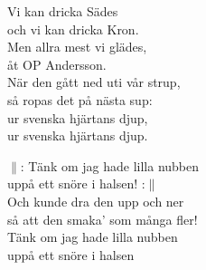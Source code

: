 \documentclass[a6paper, 10pt, twoside]{article}
\begin{document}
\noindent
\begin{center}
\end{center}
\begin{lyrics}
Vi kan dricka Sädes \\
och vi kan dricka Kron. \\
Men allra mest vi glädes, \\
åt OP Andersson.
\vspace{5pt}\\
När den gått ned uti vår strup, \\
så ropas det på nästa sup: \\
ur svenska hjärtans djup, \\
ur svenska hjärtans djup. 
\end{lyrics}
\vspace{30pt}
\begin{center}
\end{center}
\begin{lyrics}
$\|$: Tänk om jag hade lilla nubben \\
uppå ett snöre i halsen! :$\|$
\vspace{5pt}\\
Och kunde dra den upp och ner \\
så att den smaka' som många fler! \\
Tänk om jag hade lilla nubben \\
uppå ett snöre i halsen 
\end{lyrics}
\end{document}
